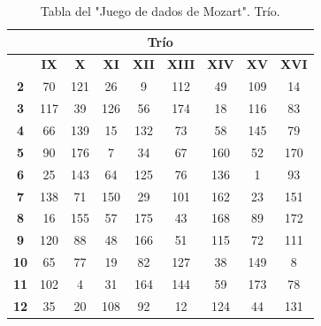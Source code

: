 \documentclass[a4paper, openright, 11pt, titlepage]{report}
\theoremstyle{definition}\newtheorem{defin}[propo]{Definition}
\theoremstyle{definition}\newtheorem{obser}[propo]{Remark}
\theoremstyle{definition}\newtheorem{ejem}[propo]{Ejemplo}
\theoremstyle{definition}\newtheorem{algoritmo}[propo]{Algoritmo}
\begin{document}
\begin{table}[H]
    \centering
    \begin{tabular}{|c|c|c|c|c|c|c|c|c|}
    \hline
    \multicolumn{9}{|c|}{Trío}\\
    \hline \hline 
         & \textbf{IX} & \textbf{X} & \textbf{XI} & \textbf{XII} & \textbf{XIII} & \textbf{XIV} & \textbf{XV} & \textbf{XVI}\\
         \hline
         \textbf{2} & 70 & 121 & 26 & 9 & 112 & 49 & 109 & 14\\
         \hline
         \textbf{3} & 117 & 39 & 126 & 56 & 174 & 18 & 116 & 83\\
         \hline
         \textbf{4} & 66 & 139 & 15 & 132 & 73 & 58 & 145 & 79\\
         \hline
         \textbf{5} & 90 & 176 & 7 & 34 & 67 & 160 & 52 & 170\\
         \hline
         \textbf{6} & 25 & 143 & 64 & 125 & 76 & 136 & 1 & 93\\
         \hline
         \textbf{7} & 138 & 71 & 150 & 29 & 101 & 162 & 23 & 151\\
         \hline
         \textbf{8} & 16 & 155 & 57 & 175 & 43 & 168 & 89 & 172\\
         \hline
         \textbf{9} & 120 & 88 & 48 & 166 & 51 & 115 & 72 & 111\\
         \hline
         \textbf{10} & 65 & 77 & 19 & 82 & 127 & 38 & 149 & 8\\
         \hline
         \textbf{11} & 102 & 4 & 31 & 164 & 144 & 59 & 173 & 78\\
         \hline
         \textbf{12} & 35 & 20 & 108 & 92 & 12 & 124 & 44 & 131\\
         \hline
    \end{tabular}
    \caption{Tabla del "Juego de dados de Mozart". Trío.}
\end{table}
\end{document}
